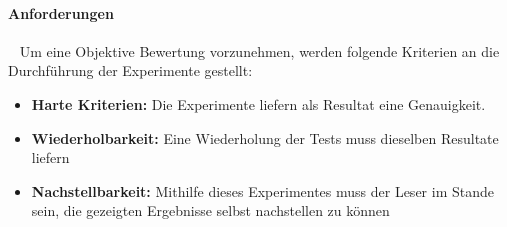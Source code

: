 \paragraph{Anforderungen} ~\newline
Um eine Objektive Bewertung vorzunehmen, werden folgende Kriterien an die Durchführung der Experimente gestellt: 

\begin{itemize}
	\item \textbf{Harte Kriterien:} Die Experimente liefern als Resultat eine Genauigkeit. 
	\item \textbf{Wiederholbarkeit:} Eine Wiederholung der Tests muss dieselben Resultate liefern
	\item \textbf{Nachstellbarkeit:} Mithilfe dieses Experimentes muss der Leser im Stande sein, die gezeigten Ergebnisse selbst nachstellen zu können
\end{itemize}